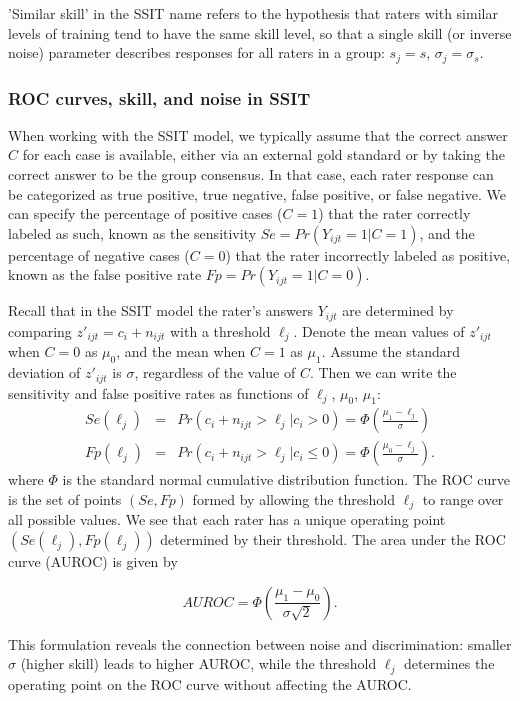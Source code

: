 \documentclass[num-refs]{wiley-article}
\begin{document}
'Similar skill' in the SSIT name refers to the hypothesis that raters with similar levels of training tend to have the same skill level, so that a single skill (or inverse noise) parameter describes responses for all raters in a group: $s_j = s$, $\sigma_j = \sigma_s$.

\subsubsection*{ROC curves, skill, and noise in SSIT}\label{section-ROC}
When working with the SSIT model, we typically assume that the correct answer $C$ for each case is available, either via an external gold standard or by taking the correct answer to be the group consensus. In that case, each rater response can be categorized as true positive, true negative, false positive, or false negative. We can specify the percentage of positive cases ($C=1$) that the rater correctly labeled as such, known as the sensitivity $Se = Pr(Y_{ijt}=1|C=1)$, and the percentage of negative cases ($C=0$) that the rater incorrectly labeled as positive, known as the false positive rate $Fp = Pr(Y_{ijt}=1|C=0)$.

Recall that in the SSIT model the rater's answers $Y_{ijt}$ are determined by comparing $z'_{ijt} = c_i + n_{ijt}$ with a threshold $\ell_j$. Denote the mean values of $z'_{ijt}$ when $C=0$ as $\mu_0$, and the mean when $C=1$ as $\mu_1$. Assume the standard deviation of $z'_{ijt}$ is $\sigma$, regardless of the value of $C$. Then we can write the sensitivity and false positive rates as functions of $\ell_j$, $\mu_0$, $\mu_1$:
\begin{eqnarray*}
    Se(\ell_j) &=& Pr(c_{i}+n_{ijt}>\ell_j|c_{i}>0) = \Phi\left(\frac{\mu_1-\ell_j}{\sigma}\right)\\
    Fp(\ell_j) &=& Pr(c_{i}+n_{ijt}>\ell_j|c_i \leq 0) = \Phi\left(\frac{\mu_0-\ell_j}{\sigma}\right).
\end{eqnarray*}
where $\Phi$ is the standard normal cumulative distribution function. The ROC curve is the set of points $(Se, Fp)$ formed by allowing the threshold $\ell_j$ to range over all possible values. We see that each rater has a unique operating point $(Se(\ell_j), Fp(\ell_j))$ determined by their threshold. The area under the ROC curve (AUROC) is given by

$$AUROC = \Phi\left(\frac{\mu_1-\mu_0}{\sigma \sqrt{2}}\right).$$

This formulation reveals the connection between noise and discrimination: smaller $\sigma$ (higher skill) leads to higher AUROC, while the threshold $\ell_j$ determines the operating point on the ROC curve without affecting the AUROC.
\end{document}
